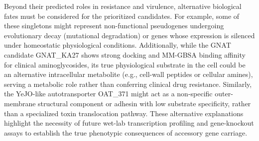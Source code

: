 \documentclass[pdflatex,sn-mathphys-num]{sn-jnl}
\begin{document}
Beyond their predicted roles in resistance and virulence, alternative biological fates must be considered for the prioritized candidates. For example, some of these singletons might represent non-functional pseudogenes undergoing evolutionary decay (mutational degradation) or genes whose expression is silenced under homeostatic physiological conditions. Additionally, while the GNAT candidate GNAT\_KA27 shows strong docking and MM-GBSA binding affinity for clinical aminoglycosides, its true physiological substrate in the cell could be an alternative intracellular metabolite (e.g., cell-wall peptides or cellular amines), serving a metabolic role rather than conferring clinical drug resistance. Similarly, the YeJO-like autotransporter OAT\_371 might act as a non-specific outer-membrane structural component or adhesin with low substrate specificity, rather than a specialized toxin translocation pathway. These alternative explanations highlight the necessity of future wet-lab transcription profiling and gene-knockout assays to establish the true phenotypic consequences of accessory gene carriage.
\end{document}
